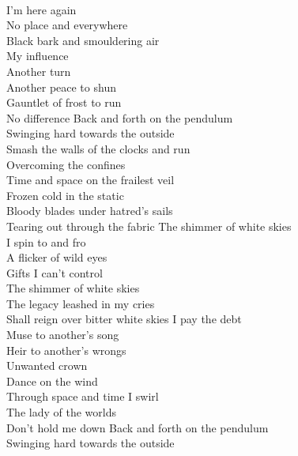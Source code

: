 \tab{}\tab{}\\
I'm here again \tab{}\tab{}\\
No place and everywhere\tab{}\\
Black bark and smouldering air\\
My influence\tab{}\tab{}\\
Another turn\tab{}\tab{}\\
Another peace to shun\tab{}\\
Gauntlet of frost to run\tab{}\\
No difference\tab{}\tab{}
\hops
{} Back and forth on the pendulum\\
 Swinging hard towards the outside\\
 Smash the walls of the clocks and run\\
 Overcoming the confines\tab{}\\
 Time and space on the frailest veil\\
 Frozen cold in the static\tab{}\\
 Bloody blades under hatred's sails\\
 Tearing out through the fabric
\hop
{} {} The shimmer of white skies\\
 {} I spin to and fro\tab{}\\
 {} A flicker of wild eyes\tab{}\\
 {} Gifts I can't control\tab{}\\
 {} The shimmer of white skies\\
 {} The legacy leashed in my cries\\
 {} Shall reign over bitter white skies
\hops
I pay the debt\\
Muse to another's song\\
Heir to another's wrongs\\
Unwanted crown\\
Dance on the wind\\
Through space and time I swirl\\
The lady of the worlds\\
Don't hold me down
\hops
{} Back and forth on the pendulum\\
 Swinging hard towards the outside\\
